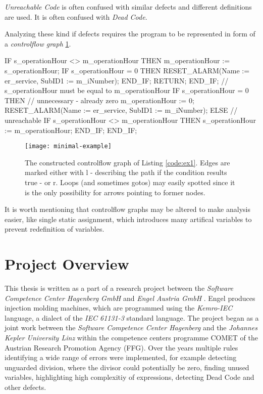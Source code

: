 \emph{Unreachable Code} is often confused with similar defects and different definitions are used.
It is often confused with \emph{Dead Code}.

Analyzing these kind if defects requires the program to be represented in form of a \emph{controlflow graph} \ref{fig:cfg}.


\begin{program}
    \begin{GenericCode}
IF s_operationHour <> m_operationHour THEN
    m_operationHour := s_operationHour;
    IF s_operationHour = 0 THEN
        RESET_ALARM(Name := er_service, SubID1 := m_iNumber);
    END_IF;
    RETURN;
END_IF;
// s_operationHour must be equal to m_operationHour
IF s_operationHour = 0 THEN
    // unnecessary - already zero
    m_operationHour := 0;
    RESET_ALARM(Name := er_service, SubID1 := m_iNumber);
ELSE
    // unreachable
    IF s_operationHour <> m_operationHour THEN
        s_operationHour := m_operationHour;
    END_IF;
END_IF;\end{GenericCode}
    \caption{A minimal example containing unreachable code due to unsatisfiable conditions. The condition in line 15 is never reachable, since this case was already handeld in line 1 and the state of that variable did not change.}
    \label{code:ex1}
\end{program}
\begin{figure}
  \centering
  \texttt{[image: minimal-example]}
  \caption{The constructed controlflow graph of Listing \ref{code:ex1}. Edges are marked either with l - describing the path if the condition results true - or r. Loops (and sometimes gotos) may easily spotted since it is the only possibility for arrows pointing to former nodes.}
  \label{fig:cfg}
\end{figure}

It is worth mentioning that controlflow graphs may be altered to make analysis easier, like single static assignment, which introduces many artifical variables to prevent redefinition of variables.

\section{Project Overview}
\label{sec:project overview}
This thesis is written as a part of a research project between the \emph{Software Competence Center Hagenberg GmbH} \cite{ScchGmbH} and \emph{Engel Austria GmbH} \cite{EngelGmbH}.
Engel produces injection molding machines, which are programmed using the \emph{Kemro-IEC} language, a dialect of the \emph{IEC 61131-3} standard language.
The project began as a joint work between the \emph{Software Competence Center Hagenberg} and the \emph{Johannes Kepler University Linz} \cite{jku, Prahofer_2012} within the competence centers programme COMET of the Austrian Research Promotion Agency (FFG).
Over the years multiple rules identifying a wide range of errors were implemented, for example detecting unguarded division, where the divisor could potentially be zero, finding unused variables, highlighting high complexitiy of expressions, detecting Dead Code and other defects.

